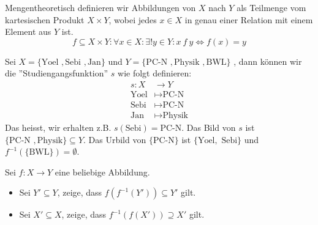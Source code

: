 \begin{remark}
Mengentheoretisch definieren wir Abbildungen von $X$ nach $Y$ als Teilmenge vom kartesischen Produkt $X \times Y$, wobei jedes $x\in X$ in genau einer Relation mit einem Element aus $Y$ ist.
$$f \subseteq X \times Y: \forall x \in X: \exists! y \in Y: x\ f\ y \iff f(x) = y$$
\end{remark}

\begin{example}[ ] \label{ex_example_function} Sei $X = \{\text{Yoel }, \text{Sebi }, \text{Jan}\}$ und $Y =  \{\text{PC-N }, \text{Physik }, \text{BWL}\}$ , dann können wir die ''Studiengangsfunktion'' $s$ wie folgt definieren:
\begin{align*}
s: X &\to Y \\
\text{Yoel} & \mapsto \text{PC-N} \\
\text{Sebi} & \mapsto \text{PC-N} \\
\text{Jan} & \mapsto \text{Physik}
\end{align*}
Das heisst, wir erhalten z.B. $s(\text{Sebi}) = \text{PC-N}$. Das Bild von $s$ ist $\{\text{PC-N }, \text{Physik}\} \subseteq Y$. Das Urbild von $\{\text{PC-N}\}$ ist $\{\text{Yoel}, \text{ Sebi}\}$ und $f^{-1}(\{\text{BWL}\}) = \emptyset$.
\end{example}

\begin{exercise}[Urbild] Sei $f: X \to Y$ eine beliebige Abbildung.
\begin{itemize}
    \item Sei $Y' \subseteq Y$, zeige, dass $f(f^{-1}(Y')) \subseteq Y'$ gilt.
    \item Sei $X' \subseteq X$, zeige, dass $f^{-1}(f(X')) \supseteq X'$ gilt.
\end{itemize}
\end{exercise}

